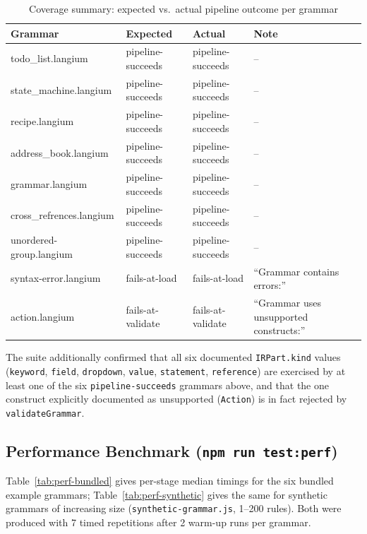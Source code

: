 \documentclass[runningheads]{llncs}
\begin{document}
{\begin{table}[h]
\centering
\caption{Coverage summary: expected vs.\ actual pipeline outcome per grammar}
\label{tab:coverage}
\begin{tabularx}{\textwidth}{lllX}
\hline
Grammar & Expected & Actual & Note \\
\hline
todo\_list.langium     & pipeline-succeeds & pipeline-succeeds & -- \\
state\_machine.langium & pipeline-succeeds & pipeline-succeeds & -- \\
recipe.langium         & pipeline-succeeds & pipeline-succeeds & -- \\
address\_book.langium  & pipeline-succeeds & pipeline-succeeds & -- \\
grammar.langium        & pipeline-succeeds & pipeline-succeeds & -- \\
cross\_refrences.langium        & pipeline-succeeds & pipeline-succeeds & -- \\
unordered-group.langium& pipeline-succeeds & pipeline-succeeds & -- \\
syntax-error.langium   & fails-at-load     & fails-at-load     & ``Grammar contains errors:'' \\
action.langium         & fails-at-validate & fails-at-validate & ``Grammar uses unsupported constructs:'' \\
\hline
\end{tabularx}
\end{table}

The suite additionally confirmed that all six documented \texttt{IRPart.kind} values (\texttt{keyword}, \texttt{field}, \texttt{dropdown}, \texttt{value}, \texttt{statement}, \texttt{reference}) are exercised by at least one of the six \texttt{pipeline-succeeds} grammars above, and that the one construct explicitly documented as unsupported (\texttt{Action}) is in fact rejected by \texttt{validateGrammar}.

\subsection{Performance Benchmark (\texttt{npm run test:perf})}
\label{sec:appendix-perf}

Table~\ref{tab:perf-bundled} gives per-stage median timings for the six bundled example grammars; Table~\ref{tab:perf-synthetic} gives the same for synthetic grammars of increasing size (\texttt{synthetic-grammar.js}, 1--200 rules). Both were produced with 7 timed repetitions after 2 warm-up runs per grammar.

}
\end{document}
